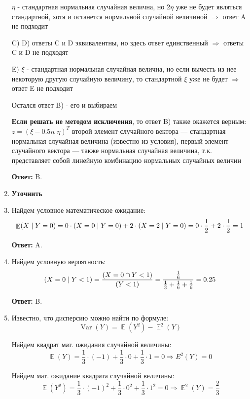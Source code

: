 \documentclass[a4paper]{article} %
\DeclareMathOperator{\Var}{Var}
\DeclareMathOperator{\E}{\mathbb{E}}
\let\P\relax
\DeclareMathOperator{\P}{\mathbb{P}}
\begin{document}
\begin{enumerate}
    $\eta$ - стандартная нормальная случайная велична, но $2\eta$ уже не будет являться стандартной, хотя и останется нормальной случайной величиной $\Rightarrow$ ответ A не подходит
    
    C) D)  ответы C и D эквивалентны, но здесь ответ единственный  $\Rightarrow$ ответы C и D не подходят
    
    E) $\xi$ - стандартная нормальная случайная велична, но если вычесть из нее некоторую другую случайную величину, то стандартной $\xi$ уже не будет $\Rightarrow$ ответ E не подходит
    
    Остался ответ B) - его и выбираем
    
    \textbf{Если решать не методом исключения}, то ответ B) также окажется верным:
    $z = (\xi-0.5\eta, \eta)^T$ второй элемент случайного вектора — стандартная нормальная случайная величина (известно из условия), первый элемент случайного вектора — также нормальная случайная величина, т.к. представляет собой линейную комбинацию нормальных случайных величин
    
    \textbf{Ответ:} B.
    
    
    \item
    \textbf{Уточнить}

    
    \item
    Найдем условное математическое ожидание:
    \[
    \E(X \mid Y=0) = 0 \cdot \P(X=0 \mid Y=0) + 2 \cdot \P(X=2 \mid Y=0) = 0 \cdot \frac{1}{2} + 2 \cdot \frac{1}{2} = 1
    \]
    
    \textbf{Ответ:} A.
    
    
    \item
    Найдем условную вероятность:
    \[
    \P(X=0 \mid Y<1) = \frac{\P(X=0 \cap Y<1)}{\P(Y<1)} = \frac{\frac{1}{6}}{\frac{1}{3}+\frac{1}{6}+\frac{1}{6}} = 0.25
    \]
    
    \textbf{Ответ:} B.
    
    
    \item
    Известно, что дисперсию можно найти по формуле:
    \[
    \Var(Y) = \E(Y^2) - \E^2(Y)
    \]
    
    Найдем квадрат мат. ожидания случайной величины:
    \[
    \E(Y) = \frac{1}{3} \cdot (-1) + \frac{1}{3} \cdot 0 + \frac{1}{3} \cdot 1 = 0 \Rightarrow E^2(Y)=0
    \]
    
    Найдем мат. ожидание квадрата случайной величины:
    \[
    \E(Y^2) = \frac{1}{3} \cdot (-1)^2 + \frac{1}{3} \cdot 0^2 + \frac{1}{3} \cdot 1^2 = 0 \Rightarrow \E^2(Y)= \frac{2}{3}
    \]
    

\end{enumerate}
\end{document}

